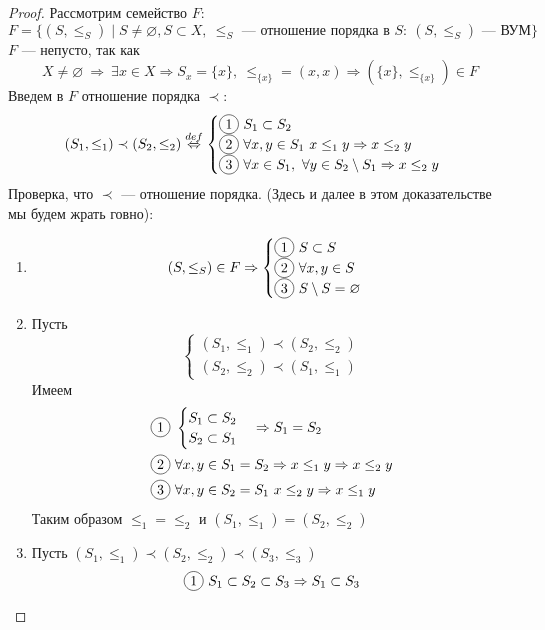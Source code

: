 \begin{proof}
	Рассмотрим семейство $F$:
	$$
	F = \{(S, \leq_S)\mid S \neq \varnothing, S \subset X, \ \leq_S \text{ --- отношение порядка в } S: \ (S, \leq_S) \text{ --- ВУМ} \} 
	$$
	$F$ --- непусто, так как 
	$$
	X \neq \varnothing \ \Rightarrow \  \exists x \in X \Rightarrow S_x = \{x\}, \ \leq_{\{x\}} = (x,x) \Rightarrow (\{x\}, \leq_{\{x\}}) \in F
	$$
	Введем в $F$ отношение порядка $\prec$:
	$$
	(S_1, \leq_1) \prec (S_2, \leq_2) \deff
	\begin{cases}
		\circled{1} \ S_1 \subset S_2 \\
		\circled{2} \ \forall x, y \in S_1 \ x \leq_1 y \Rightarrow x \leq_2 y \\
		\circled{3} \ \forall  x \in S_1, \ \forall y \in S_2 \setminus S_1 \Rightarrow x \leq_2 y
	\end{cases}
	$$
	Проверка, что $\prec$ --- отношение порядка. (Здесь и далее в этом доказательстве мы будем жрать говно): 
	\begin{enumerate}
		\item 
		$$(S, \leq_S) \in F \Rightarrow
		\begin{cases}
		 	\circled{1} \ S \subset S \\
		 	\circled{2} \ \forall x,y \in S  \\
		 	\circled{3} \ S \setminus S = \varnothing
		\end{cases}
	$$
	\item Пусть
	$$
	\begin{cases}
		(S_1, \leq_1) \prec (S_2, \leq_2) \\
		(S_2, \leq_2) \prec (S_1, \leq_1)
	\end{cases}
	$$
	Имеем
\begin{align*}
	&\circled{1} \ \begin{cases}
		S_1 \subset S_2 \\
		S_2 \subset S_1 
	\end{cases} \Rightarrow S_1 = S_2 \\
	&\circled{2} \ \forall x,y \in S_1 = S_2 \Rightarrow x \leq_1 y \Rightarrow x \leq_2 y \\
	&\circled{3} \ \forall x,y \in S_2 = S_1 \ x \leq_2 y \Rightarrow x \leq_1 y
\end{align*}
	Таким образом $\leq_1 = \leq_2$ и $(S_1, \leq_1) = (S_2, \leq_2)$
	\item 
	Пусть $(S_1, \leq_1) \prec (S_2, \leq_2) \prec (S_3, \leq_3)$
	\begin{align*}
		& \circled{1} \ S_1 \subset S_2 \subset S_3 \Rightarrow S_1 \subset S_3 \\

\end{align*}
\end{enumerate}
\end{proof}
